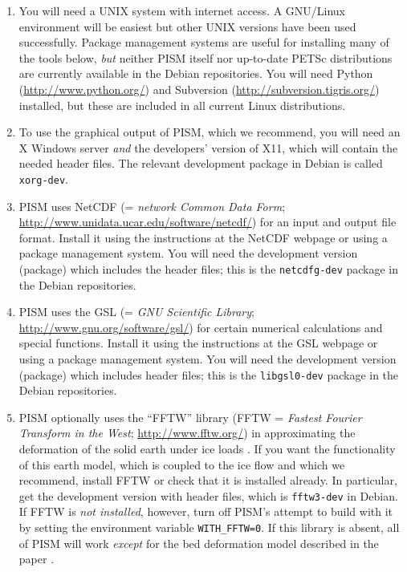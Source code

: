 \documentclass[11pt,final]{amsart}
\begin{document}
\begin{enumerate}
\item You will need a UNIX system with internet access.  A GNU/Linux environment will be easiest but other UNIX versions have been used successfully.  Package management systems are useful for installing many of the tools below, \emph{but} neither PISM itself nor up-to-date PETSc distributions are currently available in the Debian repositories.  You will need Python (\url{http://www.python.org/}) and Subversion (\url{http://subversion.tigris.org/}) installed, but these are included in all current Linux distributions.

\item To use the graphical output of PISM, which we recommend, you will need an X Windows server \emph{and} the developers' version of X11, which will contain the needed header files.  The relevant development package in Debian is called \verb|xorg-dev|.

\item PISM uses NetCDF (= \emph{network Common Data Form}; \url{http://www.unidata.ucar.edu/software/netcdf/}) for an input and output file format.   Install it using the instructions at the NetCDF webpage or using a package management system.  You will need the development version (package) which includes the header files; this is the \verb|netcdfg-dev| package in the Debian repositories.

\item PISM uses the GSL (= \emph{GNU Scientific Library}; \url{http://www.gnu.org/software/gsl/}) for certain numerical calculations and special functions.  Install it using the instructions at the GSL webpage or using a package management system.  You will need the development version (package) which includes header files; this is the \verb|libgsl0-dev| package in the Debian repositories.

\item PISM optionally uses the ``FFTW'' library (FFTW = \emph{Fastest Fourier Transform in the West}; \url{http://www.fftw.org/}) in approximating the deformation of the solid earth under ice loads \cite{BLKfastearth}.  If you want the functionality of this earth model, which is coupled to the ice flow and which we recommend, install FFTW or check that it is installed already.   In particular, get the development version with header files, which is \verb|fftw3-dev| in Debian.   If FFTW is \emph{not installed}, however, turn off PISM's attempt to build with it by setting the environment variable \verb|WITH_FFTW=0|.   If this library is absent, all of PISM will work \emph{except} for the bed deformation model described in the paper \cite{BLKfastearth}.


\end{enumerate}
\end{document}

